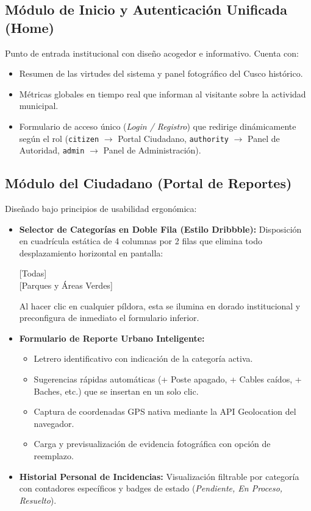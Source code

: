 \documentclass[12pt,a4paper]{article}
\begin{document}
\subsection{Módulo de Inicio y Autenticación Unificada (Home)}
Punto de entrada institucional con diseño acogedor e informativo. Cuenta con:
\begin{itemize}[leftmargin=*]
    \item Resumen de las virtudes del sistema y panel fotográfico del Cusco histórico.
    \item Métricas globales en tiempo real que informan al visitante sobre la actividad municipal.
    \item Formulario de acceso único (\textit{Login / Registro}) que redirige dinámicamente según el rol (\texttt{citizen} $\rightarrow$ Portal Ciudadano, \texttt{authority} $\rightarrow$ Panel de Autoridad, \texttt{admin} $\rightarrow$ Panel de Administración).
\end{itemize}

\subsection{Módulo del Ciudadano (Portal de Reportes)}
Diseñado bajo principios de usabilidad ergonómica:
\begin{itemize}[leftmargin=*]
    \item \textbf{Selector de Categorías en Doble Fila (Estilo Dribbble):} Disposición en cuadrícula estática de 4 columnas por 2 filas que elimina todo desplazamiento horizontal en pantalla:
    \begin{center}
    \small
     [Todas]   \\
    \vspace{0.15cm}
     [Parques y Áreas Verdes]   
    \end{center}
    Al hacer clic en cualquier píldora, esta se ilumina en dorado institucional y preconfigura de inmediato el formulario inferior.
    
    \item \textbf{Formulario de Reporte Urbano Inteligente:}
    \begin{itemize}
        \item Letrero identificativo con indicación de la categoría activa.
        \item Sugerencias rápidas automáticas (+ Poste apagado, + Cables caídos, + Baches, etc.) que se insertan en un solo clic.
        \item Captura de coordenadas GPS nativa mediante la API Geolocation del navegador.
        \item Carga y previsualización de evidencia fotográfica con opción de reemplazo.
    \end{itemize}

    \item \textbf{Historial Personal de Incidencias:}
    Visualización filtrable por categoría con contadores específicos y badges de estado (\textit{Pendiente, En Proceso, Resuelto}).
\end{itemize}
\end{document}
